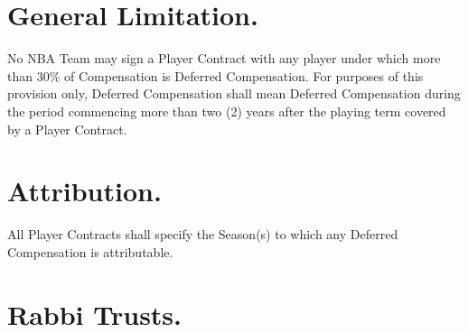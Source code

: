 \documentclass[
]{book}
\begin{document}
\hypertarget{general-limitation.-1}{%
\section{General Limitation.}\label{general-limitation.-1}}

No NBA Team may sign a Player Contract with any player under which more than 30\% of Compensation is Deferred Compensation. For purposes of this provision only, Deferred Compensation shall mean Deferred Compensation during the period commencing more than two (2) years after the playing term covered by a Player Contract.

\hypertarget{attribution.}{%
\section{Attribution.}\label{attribution.}}

All Player Contracts shall specify the Season(s) to which any Deferred Compensation is attributable.

\hypertarget{rabbi-trusts.}{%
\section{Rabbi Trusts.}\label{rabbi-trusts.}}
\end{document}
